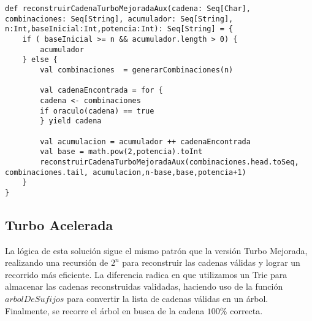 \documentclass[conference]{IEEEtran}
\begin{document}
\newpage
\begin{lstlisting}
def reconstruirCadenaTurboMejoradaAux(cadena: Seq[Char], combinaciones: Seq[String], acumulador: Seq[String], n:Int,baseInicial:Int,potencia:Int): Seq[String] = {
    if ( baseInicial >= n && acumulador.length > 0) {
        acumulador
    } else {
        val combinaciones  = generarCombinaciones(n)
                
        val cadenaEncontrada = for {
        cadena <- combinaciones
        if oraculo(cadena) == true
        } yield cadena
            
        val acumulacion = acumulador ++ cadenaEncontrada
        val base = math.pow(2,potencia).toInt
        reconstruirCadenaTurboMejoradaAux(combinaciones.head.toSeq, combinaciones.tail, acumulacion,n-base,base,potencia+1)
    }
}

\end{lstlisting}

\subsection{\textbf{Turbo Acelerada}}



La lógica de esta solución sigue el mismo patrón que la versión Turbo Mejorada, realizando una recursión de $2^n$ para reconstruir las cadenas válidas y lograr un recorrido más eficiente. La diferencia radica en que utilizamos un Trie para almacenar las cadenas reconstruidas validadas, haciendo uso de la función $arbolDeSufijos$ para convertir la lista de cadenas válidas en un árbol. Finalmente, se recorre el árbol en busca de la cadena $100\%$ correcta.
\end{document}
